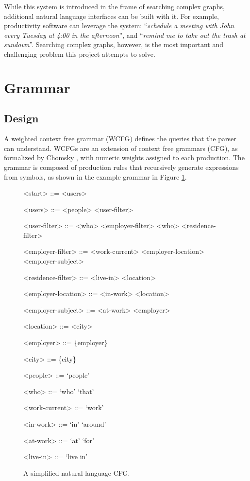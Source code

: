 \documentclass{article}
\begin{document}
While this system is introduced in the frame of searching complex graphs, additional natural language interfaces can be built with it. For example, productivity software can leverage the system: ``\textit{schedule a meeting with John every Tuesday at 4:00 in the afternoon}'', and ``\textit{remind me to take out the trash at sundown}''. Searching complex graphs, however, is the most important and challenging problem this project attempts to solve.


\section{Grammar}
\subsection{Design}
A weighted context free grammar (WCFG) defines the queries that the parser can understand. WCFGs are an extension of context free grammars (CFG), as formalized by Chomsky \citep{Chomsky1956}, with numeric weights assigned to each production. The grammar is composed of production rules that recursively generate expressions from symbols, as shown in the example grammar in Figure \ref{fig:grammar}.

\begin{figure}[H]
\begin{adjustwidth}{4.1em}{4.1em}
\setlength{\grammarindent}{11em}
\begin{grammar}
<start> ::= <users>

<users> ::= <people> <user-filter>

<user-filter> ::= <who> <employer-filter>
\alt <who> <residence-filter>

<employer-filter> ::= <work-current> <employer-location>
 <employer-subject>

<residence-filter> ::= <live-in> <location>

<employer-location> ::= <in-work> <location>

<employer-subject> ::= <at-work> <employer>

<location> ::= <city>

<employer> ::= \{employer\}

<city> ::= \{city\}

<people> ::= `people'

<who> ::= `who'
\alt `that'

<work-current> ::= `work'

<in-work> ::= `in'
\alt `around'

<at-work> ::= `at'
\alt `for'

<live-in> ::= `live in'
\end{grammar}
\end{adjustwidth}
\caption{A simplified natural language CFG.}
\label{fig:grammar}
\end{figure}
\end{document}
